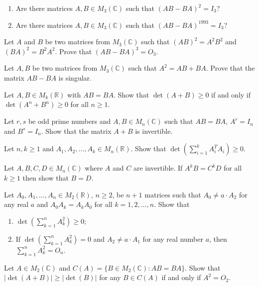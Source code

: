 \documentclass[12pt]{article}
\begin{document}
\begin{problems}
\item
\begin{enumerate}[label=(\alph*)]
\item Are there matrices $A,B\in M_3(\mathbb{C})$ such that $(AB-BA)^2=I_3$?
\item Are there matrices $A,B\in M_3(\mathbb{C})$ such that $(AB-BA)^{1993}=I_3$?
\end{enumerate}

\item Let $A$ and $B$ be two matrices from $M_3(\mathbb{C})$ such that $(AB)^2=A^2B^2$ and $(BA)^2=B^2A^2$. Prove that $(AB-BA)^3=O_3$.

\item Let $A,B$ be two matrices from $M_3(\mathbb{C})$ such that $A^2=AB+BA$. Prove that the matrix $AB-BA$ is singular.

\item Let $A,B\in M_k(\mathbb{R})$ with $AB=BA$. Show that $\det(A+B)\ge 0$ if and only if $\det(A^n+B^n)\ge 0$ for all $n\ge 1$.

\item Let $r,s$ be odd prime numbers and $A,B\in M_n(\mathbb{C})$ such that $AB=BA$, $A^r=I_n$ and $B^s=I_n$. Show that the matrix $A+B$ is invertible.

\item Let $n,k\ge 1$ and $A_1,A_2,\dots,A_k\in M_n(\mathbb{R})$. Show that $\det\!\left(\sum_{i=1}^k A_i^TA_i\right)\ge 0$.

\item Let $A,B,C,D\in M_n(\mathbb{C})$ where $A$ and $C$ are invertible. If $A^kB=C^kD$ for all $k\ge 1$ then show that $B=D$.

\item Let $A_0,A_1,\dots,A_n\in M_2(\mathbb{R})$, $n\ge 2$, be $n+1$ matrices such that $A_0\ne a\cdot A_2$ for any real $a$ and $A_0A_k=A_kA_0$ for all $k=1,2,\dots,n$. Show that
\begin{enumerate}[label=(\alph*)]
\item $\det\!\left(\sum_{k=1}^n A_k^2\right) \ge 0$;
\item If $\det\!\left(\sum_{k=1}^n A_k^2\right)=0$ and $A_2\ne a\cdot A_1$ for any real number $a$, then $\sum_{k=1}^n A_k^2 = O_n$.
\end{enumerate}

\item Let $A\in M_2(\mathbb{C})$ and $C(A)=\{B\in M_2(\mathbb{C}): AB=BA\}$. Show that $|\det(A+B)| \ge |\det(B)|$ for any $B\in C(A)$ if and only if $A^2=O_2$.


\end{problems}
\end{document}
